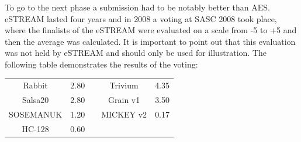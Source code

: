 	To go to the next phase a submission had to be notably better than AES.\\
	eSTREAM lasted four years and in 2008 a voting at SASC 2008 took place, where the finalists of the eSTREAM were evaluated on a scale from -5 to +5 and then the average was calculated. It is important to point out that this evaluation was not held by eSTREAM and should only be used for illustration. The following table demonstrates the results of the voting:
	\begin{table}[h!]
		\centering
		\begin{tabular}{|c c |c| c c|} 
			\hline 
			Rabbit & 2.80 & & Trivium & 4.35\\ 
			Salsa20 & 2.80 & & Grain v1 & 3.50\\
			SOSEMANUK & 1.20 & & MICKEY v2& 0.17\\
			HC-128 & 0.60 & & & \\[1ex]
			\hline
		\end{tabular}
		\label{table:eStream portfolio with SASC2008 evaluation}
	\end{table}
	
